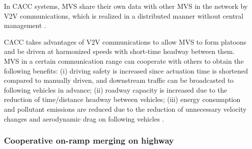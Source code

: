 

















  
 
 In CACC systems, MVS share their own data with other MVS in the network by V2V communications, which is realized in a distributed manner without central management \cite{1402433}.
 
 CACC takes advantages of V2V communications to allow MVS to form platoons and be driven at harmonized speeds with short-time headway between them.  MVS in a certain communication range can cooperate with others to obtain the following benefits: (i) driving safety is increased since actuation time is shortened compared to manually driven, and downstream traffic can be broadcasted to following vehicles in advance; (ii) roadway capacity is increased due to the reduction of time/distance headway between vehicles; (iii) energy consumption and pollutant emissions are reduced due to the reduction of unnecessary velocity changes and aerodynamic drag on following vehicles \cite{massar2021impacts}. 

\subsubsection{Cooperative on-ramp merging on highway}\label{sec:on-ramp merging}



